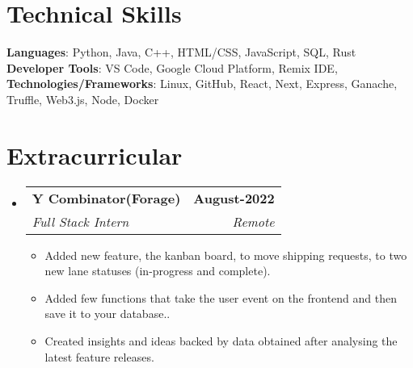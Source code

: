 \documentclass[letterpaper,11pt]{article}
\makeatletter
\newcommand{\resumeItem}[1]{
  \item\small{
    {#1 \vspace{-2pt}}
  }
}
\newcommand{\resumeSubheading}[4]{
  \vspace{-2pt}\item
    \begin{tabular*}{1.0\textwidth}[t]{l@{\extracolsep{\fill}}r}
      \textbf{#1} & \textbf{\small #2} \\
      \textit{\small#3} & \textit{\small #4} \\
    \end{tabular*}\vspace{-7pt}
}
\newcommand{\resumeSubHeadingListStart}{\begin{itemize}[leftmargin=0.0in, label={}]}
\newcommand{\resumeSubHeadingListEnd}{\end{itemize}}
\newcommand{\resumeItemListStart}{\begin{itemize}}
\newcommand{\resumeItemListEnd}{\end{itemize}\vspace{-5pt}}
\makeatother
\begin{document}
%
\section{Technical Skills}
 \begin{itemize}[leftmargin=0.15in, label={}]
    \small{\item{
     \textbf{Languages}{: Python, Java, C++, HTML/CSS, JavaScript, SQL, Rust} \\
     \textbf{Developer Tools}{: VS Code, Google Cloud Platform, Remix IDE, } \\
     \textbf{Technologies/Frameworks}{: Linux, GitHub, React, Next, Express, Ganache, Truffle, Web3.js, Node, Docker } \\
    }}
 \end{itemize}
 \vspace{-16pt}


\section{Extracurricular}
    \resumeSubHeadingListStart
        \resumeSubheading{Y Combinator(Forage)}{August-2022}{Full Stack Intern}{Remote}
            \resumeItemListStart
                \resumeItem{Added new feature, the kanban board, to move shipping requests, to two new lane statuses (in-progress and complete).}
                \resumeItem{ Added few functions that take the user event on the frontend and then save it to your database..}
                \resumeItem{Created insights and ideas backed by data obtained after analysing the latest feature releases.}
            \resumeItemListEnd
        
    \resumeSubHeadingListEnd
\end{document}
